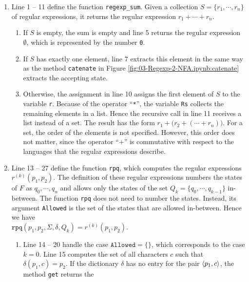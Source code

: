 \begin{enumerate}
\item Line 1 -- 11 define the function \texttt{regexp\_sum}.  Given a collection $S = \{ r_1, \cdots, r_n \}$ of
      regular expressions, it returns the regular expression $r_1 + \cdots + r_n$.
      \begin{enumerate}
      \item If $S$ is empty, the sum is empty and line 5 returns the regular expression $\emptyset$, which is
            represented by the number \texttt{0}.
      \item If $S$ has exactly one element, line 7 extracts this element in the same way as the method
            \texttt{catenate} in Figure \ref{fig:03-Regexp-2-NFA.ipynb:catenate} extracts the accepting state.
      \item Otherwise, the assignment in line 10 assigns the first element of $S$ to the variable \texttt{r}.
            Because of the operator ``\texttt{*}'', the variable \texttt{Rs} collects the remaining elements
            in a list.  Hence the recursive call in line 11 receives a list instead of a set.  The result has
            the form $r_1 + \bigl(r_2 + (\cdots + r_n)\bigr)$.  For a set, the order of the elements is not
            specified.  However, this order does not matter, since the operator ``$+$'' is commutative with
            respect to the languages that the regular expressions describe.
      \end{enumerate}
\item Line 13 -- 27 define the function \texttt{rpq}, which computes the regular expressions
      $r^{(k)}(p_1, p_2)$.  The definition of these regular expressions numbers the states of $F$ as
      $q_0, \cdots, q_n$ and allows only the states of the set $Q_k = \{ q_0, \cdots, q_{k-1} \}$ in-between.  The
      function \texttt{rpq} does not need to number the states.  Instead, its argument \texttt{Allowed} is the
      set of the states that are allowed in-between.  Hence we have
      \\[0.2cm]
      \hspace*{1.3cm}
      $\texttt{rpq}(p_1, p_2, \Sigma, \delta, Q_k) = r^{(k)}(p_1, p_2)$.
      \begin{enumerate}
      \item Line 14 -- 20 handle the case $\texttt{Allowed} = \{\}$, which corresponds to the case $k = 0$.
            Line 15 computes the set of all characters $c$ such that $\delta(p_1, c) = p_2$.  If the
            dictionary $\delta$ has no entry for the pair $\pair(p_1, c)$, the method \texttt{get} returns the

\end{enumerate}
\end{enumerate}
